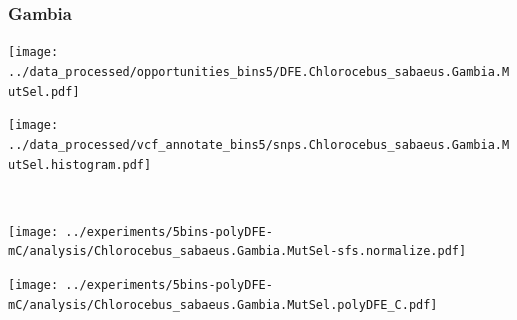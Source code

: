\subsubsection{Gambia}

\begin{minipage}{0.49\linewidth}
    \texttt{[image: ../data\_processed/opportunities\_bins5/DFE.Chlorocebus\_sabaeus.Gambia.MutSel.pdf]}
\end{minipage}
\begin{minipage}{0.49\linewidth}
    \texttt{[image: ../data\_processed/vcf\_annotate\_bins5/snps.Chlorocebus\_sabaeus.Gambia.MutSel.histogram.pdf]}
\end{minipage}
\\
\begin{minipage}{0.49\linewidth}
    \texttt{[image: ../experiments/5bins-polyDFE-mC/analysis/Chlorocebus\_sabaeus.Gambia.MutSel-sfs.normalize.pdf]}
\end{minipage}
\begin{minipage}{0.4\linewidth}
    \texttt{[image: ../experiments/5bins-polyDFE-mC/analysis/Chlorocebus\_sabaeus.Gambia.MutSel.polyDFE\_C.pdf]}
\end{minipage}
